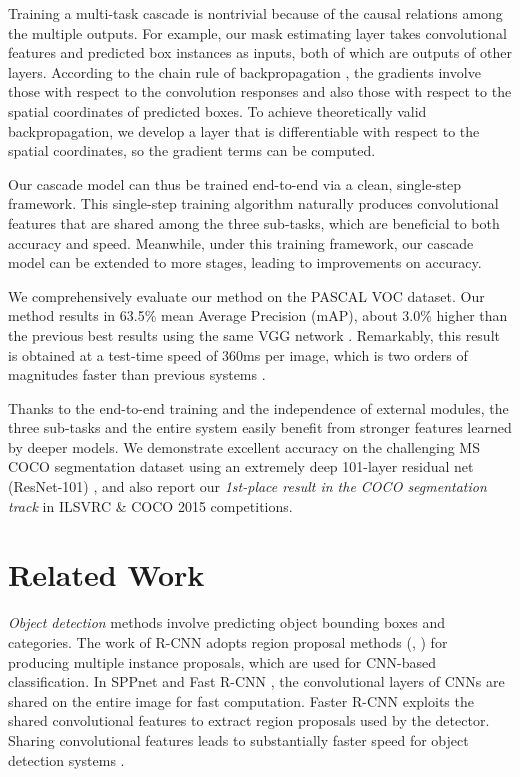 \documentclass[10pt,twocolumn,letterpaper]{article}
\begin{document}
Training a multi-task cascade is nontrivial because of the causal relations among the multiple outputs. For example, our mask estimating layer takes convolutional features and predicted box instances as inputs, both of which are outputs of other layers. According to the chain rule of backpropagation \cite{LeCun1989}, the gradients involve those with respect to the convolution responses and also those with respect to the spatial coordinates of predicted boxes. To achieve theoretically valid backpropagation, we develop a layer that is differentiable with respect to the spatial coordinates, so the gradient terms can be computed.

Our cascade model can thus be trained end-to-end via a clean, single-step framework. This single-step training algorithm naturally produces convolutional features that are shared among the three sub-tasks, which are beneficial to both accuracy and speed. Meanwhile, under this training framework, our cascade model can be extended to more stages, leading to improvements on accuracy.

We comprehensively evaluate our method on the PASCAL VOC dataset. Our method results in 63.5\% mean Average Precision (mAP), about 3.0\% higher than the previous best results \cite{Hariharan2015,Dai2015} using the same VGG network \cite{Simonyan2015}. Remarkably, this result is obtained at a test-time speed of 360ms per image, which is two orders of magnitudes faster than previous systems \cite{Hariharan2015,Dai2015}.

Thanks to the end-to-end training and the independence of external modules, the three sub-tasks and the entire system easily benefit from stronger features learned by deeper models. We demonstrate excellent accuracy on the challenging MS COCO segmentation dataset using an extremely deep 101-layer residual net (ResNet-101) \cite{He2015a}, and also report our \emph{1st-place result in the COCO segmentation track} in ILSVRC \& COCO 2015 competitions.


\section{Related Work}

\emph{Object detection} methods \cite{Girshick2014,He2014,Girshick2015,Ren2015} involve predicting object bounding boxes and categories. The work of R-CNN \cite{Girshick2014} adopts region proposal methods (\eg, \cite{Uijlings2013,Zitnick2014}) for producing multiple instance proposals, which are used for CNN-based classification. In SPPnet \cite{He2014} and Fast R-CNN \cite{Girshick2015}, the convolutional layers of CNNs are shared on the entire image for fast computation. Faster R-CNN \cite{Ren2015} exploits the shared convolutional features to extract region proposals used by the detector. Sharing convolutional features leads to substantially faster speed for object detection systems \cite{He2014,Girshick2015,Ren2015}.
\end{document}
